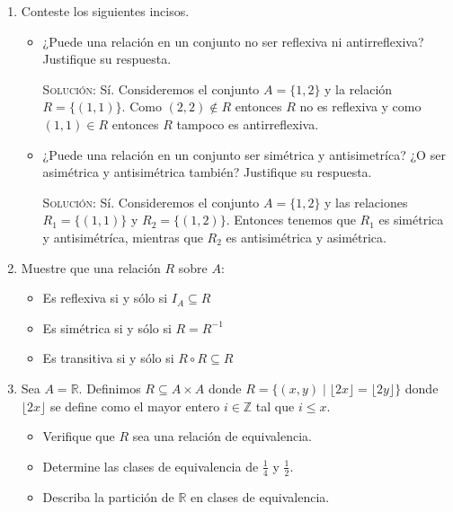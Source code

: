 \documentclass[letterpaper,11pt]{article}
\begin{document}
\begin{enumerate}
    \item Conteste los siguientes incisos.
    \begin{itemize}
        \item ¿Puede una relación en un conjunto no ser reflexiva ni
        antirreflexiva? Justifique su respuesta.

        \textsc{Solución:} Sí. Consideremos el conjunto $A = \{1, 2\}$ y la 
        relación $R = \{(1,1)\}$. Como $(2,2) \not \in R$ entonces $R$ no es 
        reflexiva y como $(1, 1) \in R$ entonces $R$ tampoco es antirreflexiva.

        \item ¿Puede una relación en un conjunto ser simétrica y 
        antisimetríca? ¿O ser asimétrica y antisimétrica también? Justifique su
        respuesta.  
        
        \textsc{Solución:} Sí. Consideremos el conjunto $A = \{1, 2\}$ y las 
        relaciones $R_{1} = \{(1,1)\}$ y $R_{2} = \{(1,2)\}$. Entonces tenemos 
        que $R_{1}$ es simétrica y antisimétríca, mientras que $R_{2}$ es 
        antisimétrica y asimétrica. 
    \end{itemize}

    \item Muestre que una relación $R$ sobre $A$:
    \begin{itemize}
        \item Es reflexiva si y sólo si $I_{A} ⊆ R$
        \item Es simétrica si y sólo si $R = R^{-1}$
        \item Es transitiva si y sólo si $R ∘ R ⊆ R$
    \end{itemize}

    \item Sea $A = ℝ$. Definimos $R ⊆ A × A$ donde $R = \{(x, y) \; | \; 
    ⌊2x⌋ = ⌊2y⌋\}$ donde $⌊2x⌋$ se define como el mayor entero $i \in ℤ$ tal que 
    $i \leq x$.
    \begin{itemize}
        \item Verifique que $R$ sea una relación de equivalencia.
        \item Determine las clases de equivalencia de $\frac{1}{4}$ y 
        $\frac{1}{2}$.
        \item Describa la partición de $ℝ$ en clases de equivalencia.
    \end{itemize}


\end{enumerate}
\end{document}
